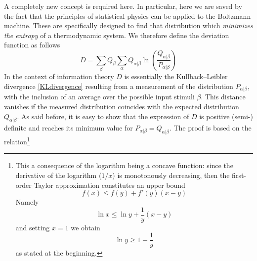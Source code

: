 A completely new concept is required here. In particular, here we are saved by the fact that the principles of statistical physics can be applied to the Boltzmann machine. These are specifically designed to find that distribution which \emph{minimizes the entropy} of a thermodynamic system. We therefore define the deviation function as
follows
\begin{equation}\label{KLdivergenceBoltzmann}
D=\sum_\beta Q_\beta\sum_\alpha Q_{\alpha|\beta}\ln{\left(\frac{Q_{\alpha|\beta}}{P_{\alpha|\beta}}\right)}
\end{equation}
In the context of information theory $D$ is essentially the Kullback--Leibler divergence \eqref{KLdivergence} resulting from a measurement of the distribution $P_{\alpha|\beta}$, with the inclusion of an average over the possible input stimuli $\beta$. This distance vanishes if the measured distribution coincides with the expected distribution $Q_{\alpha|\beta}$. As said before, it is easy to show that the expression of $D$ is positive (semi-) definite and reaches its minimum value for $P_{\alpha|\beta}=Q_{\alpha|\beta}$. The proof is based on the relation\footnote{This a consequence of the logarithm being a concave function: since the derivative of the logarithm ($1/x$) is monotonously decreasing, then the first-order Taylor approximation constitutes an upper bound
\begin{equation}
f(x)\leq f(y)+f'(y)(x-y)
\end{equation}
Namely
\begin{equation}
\ln{x}\leq\ln{y}+\frac{1}{y}(x-y)
\end{equation}
and setting $x=1$ we obtain
\begin{equation}
\ln{y}\geq 1-\frac{1}{y}
\end{equation}
as stated at the beginning.}
